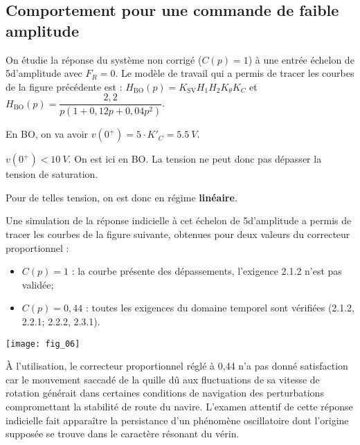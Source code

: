 \subsection*{Comportement pour une commande de faible amplitude}
\ifprof
\else
On étudie la réponse du système non corrigé ($C(p) = 1$) à une entrée échelon de 5\degres\;d’amplitude avec $F_R = 0$.
Le modèle de travail qui a permis de tracer les courbes de la figure précédente est :
$H_{\text{BO}}(p)=K_{\text{SV}} H_1 H_2 K_{\theta} K_C$ et $H_{\text{BO}}(p)=\dfrac{2,2}{p\left(1+0,12p + 0,04 p ^2  \right)}$.
\fi

\ifprof
\begin{corrige} En BO, on va avoir $v(0^{+})=5\cdot K'_C =\SI{5,5}{V}$. 

$v(0^{+})<\SI{10}{V}$. On est ici en BO. La tension ne peut donc pas dépasser la tension de saturation. 
\end{corrige}
\else
\fi





\ifprof
\begin{corrige}
Pour de telles tension, on est donc en régime \textbf{linéaire}.
\end{corrige}
\else
\fi

\ifprof
\else
Une simulation de la réponse indicielle à cet échelon de 5\degres d’amplitude a permis de tracer les courbes de la
figure suivante, obtenues pour deux valeurs du correcteur proportionnel :
\begin{itemize}
\item $C(p) = 1$ : la courbe présente des dépassements, l'exigence 2.1.2 n'est pas validée;%
\item $C(p) = 0,44$ : toutes les exigences du domaine temporel sont vérifiées (2.1.2, 2.2.1; 2.2.2, 2.3.1).%
\end{itemize}

\begin{marginfigure}
\texttt{[image: fig\_06]}
\end{marginfigure}

À l’utilisation, le correcteur proportionnel réglé à 0,44 n’a pas donné satisfaction car le mouvement saccadé
de la quille dû aux fluctuations de sa vitesse de rotation générait dans certaines conditions de navigation des
perturbations compromettant la stabilité de route du navire. L’examen attentif de cette réponse indicielle
fait apparaître la persistance d’un phénomène oscillatoire dont l’origine supposée se trouve dans le
caractère résonant du vérin.

